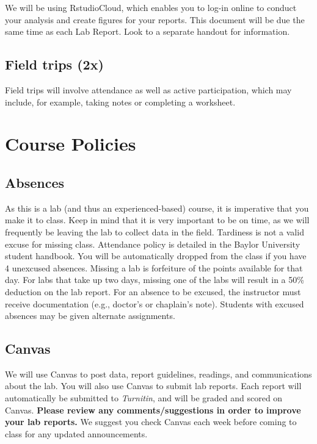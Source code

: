 \documentclass[11pt,]{article}
\begin{document}
We will be using RstudioCloud, which enables you to log-in online to
conduct your analysis and create figures for your reports. This document
will be due the same time as each Lab Report. Look to a separate handout
for information.

\hypertarget{field-trips-2x}{%
\subsection{Field trips (2x)}\label{field-trips-2x}}

Field trips will involve attendance as well as active participation,
which may include, for example, taking notes or completing a worksheet.

\hypertarget{course-policies}{%
\section{Course Policies}\label{course-policies}}

\hypertarget{absences}{%
\subsection{Absences}\label{absences}}

As this is a lab (and thus an experienced-based) course, it is
imperative that you make it to class. Keep in mind that it is very
important to be on time, as we will frequently be leaving the lab to
collect data in the field. Tardiness is not a valid excuse for missing
class. Attendance policy is detailed in the Baylor University student
handbook. You will be automatically dropped from the class if you have 4
unexcused absences. Missing a lab is forfeiture of the points available
for that day. For labs that take up two days, missing one of the labs
will result in a 50\% deduction on the lab report. For an absence to be
excused, the instructor must receive documentation (e.g., doctor's or
chaplain's note). Students with excused absences may be given alternate
assignments.

\hypertarget{canvas}{%
\subsection{Canvas}\label{canvas}}

We will use Canvas to post data, report guidelines, readings, and
communications about the lab. You will also use Canvas to submit lab
reports. Each report will automatically be submitted to \emph{Turnitin},
and will be graded and scored on Canvas. \textbf{Please review any
comments/suggestions in order to improve your lab reports.} We suggest
you check Canvas each week before coming to class for any updated
announcements.
\end{document}
